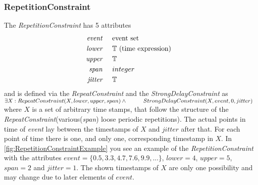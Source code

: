 	\subsubsection{RepetitionConstraint}
		The \emph{RepetitionConstraint} has 5 attributes
		\begin{align*}
			\emph{event} & \hspace{.5cm}\text{event set}\\
			\emph{lower} & \hspace{.5cm}\text{$\mathbb{T}$ (time expression)}\\
			\emph{upper} & \hspace{.5cm}\text{$\mathbb{T}$}\\
			\emph{span}	 & \hspace{.5cm}\text{$integer$}\\
			\emph{jitter}& \hspace{.5cm}\mathbb{T}
		\end{align*}
		and is defined via the \emph{RepeatConstraint} and the \emph{StrongDelayConstraint} as\\[10pt]
		\begin{math}
			\exists X: RepeatConstraint(X, lower, upper, span) \land \\
			\text{\hspace{1cm}}StrongDelayConstraint(X, event, 0, jitter)
		\end{math}\\[10pt]
		where $X$ is a set of arbitrary time stamps, that follow the structure of the \emph{RepeatConstraint}(various(\emph{span}) loose periodic repetitions). The actual points in time of \emph{event} lay between the timestamps of $X$ and $jitter$ after that. For each point of time there is one, and only one, corresponding timestamp in $X$.
		In \ref{fig:RepetitionConstraintExample} you see an example of the \emph{RepetitionConstraint} with the attributes $event=\{0.5, 3.3, 4.7, 7.6, 9.9, ...\}$, $lower=4$, $upper=5$, $span=2$ and $jitter=1$. The shown timestamps of $X$ are only one possibility and may change due to later elements of $event$.
		
